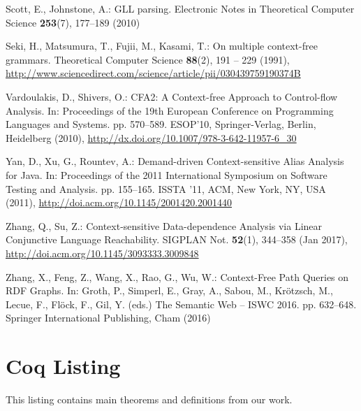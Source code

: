 \documentclass[runningheads]{llncs}
\begin{document}
\begin{thebibliography}{10}
 Scott, E., Johnstone, A.: {GLL parsing}. Electronic Notes in Theoretical
   Computer Science  \textbf{253}(7),  177--189 (2010)

 Seki, H., Matsumura, T., Fujii, M., Kasami, T.: {On multiple context-free
   grammars}. Theoretical Computer Science  \textbf{88}(2),  191 -- 229 (1991),
   \url{http://www.sciencedirect.com/science/article/pii/030439759190374B}

 Vardoulakis, D., Shivers, O.: {CFA2: A Context-free Approach to Control-flow
   Analysis}. In: Proceedings of the 19th European Conference on Programming
   Languages and Systems. pp. 570--589. ESOP'10, Springer-Verlag, Berlin,
   Heidelberg (2010), \url{http://dx.doi.org/10.1007/978-3-642-11957-6_30}

 Yan, D., Xu, G., Rountev, A.: {Demand-driven Context-sensitive Alias Analysis
   for Java}. In: Proceedings of the 2011 International Symposium on Software
   Testing and Analysis. pp. 155--165. ISSTA '11, ACM, New York, NY, USA (2011),
   \url{http://doi.acm.org/10.1145/2001420.2001440}

 Zhang, Q., Su, Z.: {Context-sensitive Data-dependence Analysis via Linear
   Conjunctive Language Reachability}. SIGPLAN Not.  \textbf{52}(1),  344--358
   (Jan 2017), \url{http://doi.acm.org/10.1145/3093333.3009848}

 Zhang, X., Feng, Z., Wang, X., Rao, G., Wu, W.: {Context-Free Path Queries on
   RDF Graphs}. In: Groth, P., Simperl, E., Gray, A., Sabou, M., Kr{\"o}tzsch,
   M., Lecue, F., Fl{\"o}ck, F., Gil, Y. (eds.) The Semantic Web -- ISWC 2016.
   pp. 632--648. Springer International Publishing, Cham (2016)

 \end{thebibliography}

\appendix

\section {Coq Listing}
This listing contains main theorems and definitions from our work.
\end{document}
